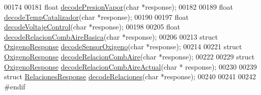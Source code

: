 \begin{DoxyCode}
00174 
00181 \textcolor{keywordtype}{float} \hyperlink{decoders_8hpp_ab86bda1fcefda784e048796e2d892475}{decodePresionVapor}(\textcolor{keywordtype}{char} *response);
00182 
00189 \textcolor{keywordtype}{float} \hyperlink{decoders_8hpp_a8251853ca2e5b8b2e88c75f50d53bc8d}{decodeTempCatalizador}(\textcolor{keywordtype}{char} *response);
00190 
00197 \textcolor{keywordtype}{float} \hyperlink{decoders_8hpp_a5937fc059394faad8c9c96a0b27a8796}{decodeVoltajeControl}(\textcolor{keywordtype}{char} *response);
00198 
00205 \textcolor{keywordtype}{float} \hyperlink{decoders_8hpp_ade77bb9f8d8a2ba3aa431cdf9bdd0c32}{decodeRelacionCombAireBasica}(\textcolor{keywordtype}{char} *response);
00206 
00213 \textcolor{keyword}{struct }\hyperlink{structOxigenoResponse}{OxigenoResponse} \hyperlink{decoders_8hpp_a5b53fc5fc37fbee9c5e389f6c8c18438}{decodeSensorOxigeno}(char *response);
00214 
00221 \textcolor{keyword}{struct }\hyperlink{structOxigenoResponse}{OxigenoResponse} \hyperlink{decoders_8hpp_a363bd4f505969098be58a175f02b9b50}{decodeRelacionCombAire}(char *response);
00222 
00229 \textcolor{keyword}{struct }\hyperlink{structOxigenoResponse}{OxigenoResponse} \hyperlink{decoders_8hpp_a4cedb500095b25b3d4fff382094b0eb9}{decodeRelacionCombAireActual}(char *
      response);
00230 
00239 \textcolor{keyword}{struct }\hyperlink{structRelacionesResponse}{RelacionesResponse} \hyperlink{decoders_8hpp_a88d7079325bf81705583d9f2101cfa15}{decodeRelaciones}(char *response);
00240 
00241 
00242 \textcolor{preprocessor}{#endif}
\end{DoxyCode}
